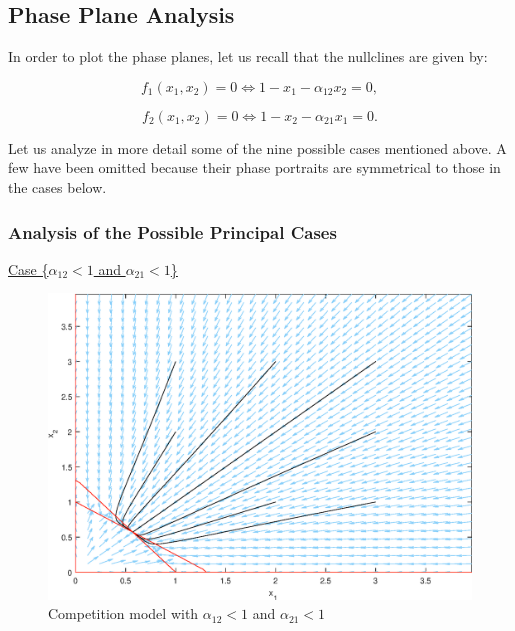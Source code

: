 \documentclass[11pt,a4paper]{scrartcl}
\theoremstyle{definition}
\begin{document}
\subsection{Phase Plane Analysis}

In order to plot the phase planes, let us recall that the nullclines are given by:

\begin{equation}\label{eq16}
	f_1(x_1, x_2)=0 \Leftrightarrow 1-x_1-\alpha_{12}x_2=0,
\end{equation}

\begin{equation} \label{eq17}
	f_2(x_1, x_2)=0 \Leftrightarrow 1-x_2-\alpha_{21}x_1=0.
\end{equation}

Let us analyze in more detail some of the nine possible cases mentioned above. A few have been omitted because their phase portraits are symmetrical to those in the cases below.

\subsubsection{Analysis of the Possible Principal Cases}

\underline{Case \Big\{$\alpha_{12} < 1$ and $\alpha_{21} < 1$\Big\}}\newline

\begin{figure}[!ht]
\centering
\includegraphics[scale=.6]{fig_1.eps}
\caption{Competition model with $\alpha_{12} < 1$ and $\alpha_{21} < 1$}
\label{figC1}
\end{figure} 
\end{document}
